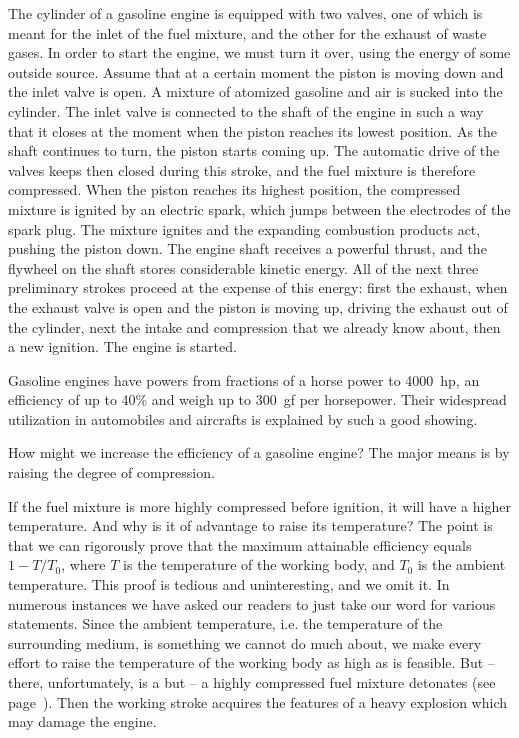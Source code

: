 The cylinder of a gasoline engine is equipped with two valves, one of which is meant for the inlet of the fuel mix­ture, and the other for the exhaust of waste gases. In order to start the engine, we must turn it over, using the energy of some outside source. Assume that at a cer­tain moment the piston is moving down and the inlet valve is open. A mixture of atomized gasoline and air is sucked into the cylinder. The inlet valve is connected to the shaft of the engine in such a way that it closes at the moment when the piston reaches its lowest position. As the shaft continues to turn, the piston starts coming up. The automatic drive of the valves keeps then closed dur­ing this stroke, and the fuel mixture is therefore compres­sed. When the piston reaches its highest position, the compressed mixture is ignited by an electric spark, which jumps between the electrodes of the spark plug. The mixture ignites and the expanding combustion products act, pushing the piston down. The engine shaft receives a powerful thrust, and the flywheel on the shaft stores considerable kinetic energy. All of the next three preliminary strokes proceed at the expense of this energy: first the exhaust, when the exhaust valve is open and the piston is moving up, driving the exhaust out of the cylinder, next the intake and compression that we already know about, then a new ignition. The engine is started. 

Gasoline engines have powers from fractions of a horse­ power to 4000~hp, an efficiency of up to 40\% and weigh up to 300~gf per horsepower. Their widespread utiliza­tion in automobiles and aircrafts is explained by such a good showing.

How might we increase the efficiency of a gasoline engine? The major means is by raising the degree of com­pression.

If the fuel mixture is more highly compressed before ignition, it will have a higher temperature. And why is it of advantage to raise its temperature? The point is that we can rigorously prove that the maximum attainable efficiency equals $1-T/T_{0}$, where $T$ is the temperature of the working body, and $T_{0}$ is the ambient temperature. This proof is tedious and uninteresting, and we omit it. In numerous instances we have asked our readers to just take our word for various statements. Since the ambient temperature, i.e. the temperature of the surrounding me­dium, is something we cannot do much about, we make every effort to raise the temperature of the working body as high as is feasible. But -- there, unfortunately, is a but -- a highly compressed fuel mixture detonates (see page~\pageref{explosion}). Then the working stroke acquires the features of a heavy explosion which may damage the engine.

